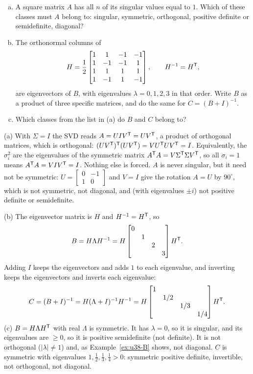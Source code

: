 \begin{exercise}\label{exr:u38-q1}
\begin{enumerate}[(a)]
\item A square matrix $A$ has all $n$ of its singular values equal to $1$. Which of these classes must $A$ belong to: singular, symmetric, orthogonal, positive definite or semidefinite, diagonal?
\item The orthonormal columns of
\[
H=\frac12\begin{bmatrix}1&1&-1&-1\\1&-1&-1&1\\1&1&1&1\\1&-1&1&-1\end{bmatrix},\qquad H^{-1}=H^{\mathsf{T}},
\]
are eigenvectors of $B$, with eigenvalues $\lambda=0,1,2,3$ in that order. Write $B$ as a product of three specific matrices, and do the same for $C=(B+I)^{-1}$.
\item Which classes from the list in (a) do $B$ and $C$ belong to?
\end{enumerate}
\end{exercise}
\begin{solution}
(a) With $\Sigma=I$ the SVD reads $A=UIV^{\mathsf{T}}=UV^{\mathsf{T}}$, a product of orthogonal matrices, which is orthogonal: $(UV^{\mathsf{T}})^{\mathsf{T}}(UV^{\mathsf{T}})=VU^{\mathsf{T}} UV^{\mathsf{T}}=I$. Equivalently, the $\sigma_i^{2}$ are the eigenvalues of the symmetric matrix $A^{\mathsf{T}} A=V\Sigma^{\mathsf{T}}\Sigma V^{\mathsf{T}}$, so all $\sigma_i=1$ means $A^{\mathsf{T}} A=VIV^{\mathsf{T}}=I$. Nothing else is forced. $A$ is never singular, but it need not be symmetric: $U=\begin{bmatrix}0&-1\\1&0\end{bmatrix}$ and $V=I$ give the rotation $A=U$ by $90^\circ$, which is not symmetric, not diagonal, and (with eigenvalues $\pm i$) not positive definite or semidefinite.

(b) The eigenvector matrix is $H$ and $H^{-1}=H^{\mathsf{T}}$, so
\[
B=H\Lambda H^{-1}=H\begin{bmatrix}0&&&\\&1&&\\&&2&\\&&&3\end{bmatrix}H^{\mathsf{T}} .
\]
Adding $I$ keeps the eigenvectors and adds $1$ to each eigenvalue, and inverting keeps the eigenvectors and inverts each eigenvalue:
\[
C=(B+I)^{-1}=H(\Lambda+I)^{-1}H^{-1}=H\begin{bmatrix}1&&&\\&1/2&&\\&&1/3&\\&&&1/4\end{bmatrix}H^{\mathsf{T}} .
\]
(c) $B=H\Lambda H^{\mathsf{T}}$ with real $\Lambda$ is symmetric. It has $\lambda=0$, so it is singular, and its eigenvalues are $\ge0$, so it is positive semidefinite (not definite). It is not orthogonal ($|\lambda|\neq1$) and, as Example~\ref{ex:u38-B} shows, not diagonal. $C$ is symmetric with eigenvalues $1,\tfrac12,\tfrac13,\tfrac14>0$: symmetric positive definite, invertible, not orthogonal, not diagonal.
\end{solution}

